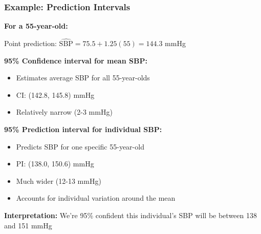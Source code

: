 \documentclass{beamer}
\begin{document}
\begin{frame}
\frametitle{Example: Prediction Intervals}
\textbf{For a 55-year-old:}

\vspace{0.3cm}
Point prediction: $\widehat{\text{SBP}} = 75.5 + 1.25(55) = 144.3$ mmHg

\vspace{0.5cm}
\textbf{95\% Confidence interval for mean SBP:}
\begin{itemize}
\item Estimates average SBP for all 55-year-olds
\item CI: (142.8, 145.8) mmHg
\item Relatively narrow (2-3 mmHg)
\end{itemize}

\vspace{0.5cm}
\textbf{95\% Prediction interval for individual SBP:}
\begin{itemize}
\item Predicts SBP for one specific 55-year-old
\item PI: (138.0, 150.6) mmHg
\item Much wider (12-13 mmHg)
\item Accounts for individual variation around the mean
\end{itemize}

\vspace{0.3cm}
\textbf{Interpretation:} We're 95\% confident this individual's SBP will be between 138 and 151 mmHg
\end{frame}
\end{document}
